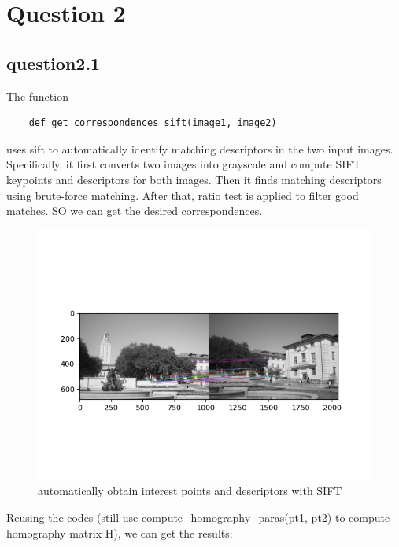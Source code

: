 \documentclass[a4paper,UTF8]{article}
\numberwithin{equation}{section}
\begin{document}
\section{Question 2}

\subsection{question2.1}
The function
\begin{lstlisting}
	def get_correspondences_sift(image1, image2)
\end{lstlisting}
uses sift to automatically identify matching descriptors in the two input images. \\
Specifically, it first converts two images into grayscale and compute SIFT keypoints and descriptors for both images. Then it finds matching descriptors using brute-force matching.
After that, ratio test is applied to filter good matches. SO we can get the desired correspondences.
\begin{figure}[H]
	\centering  %
	\includegraphics[width=1\textwidth]{sift.png}  %
	\caption{automatically obtain interest points and descriptors with SIFT}  %
\end{figure}
Reusing the codes (still use compute\_homography\_paras(pt1, pt2) to compute homography matrix H), we can get the results:
\end{document}

